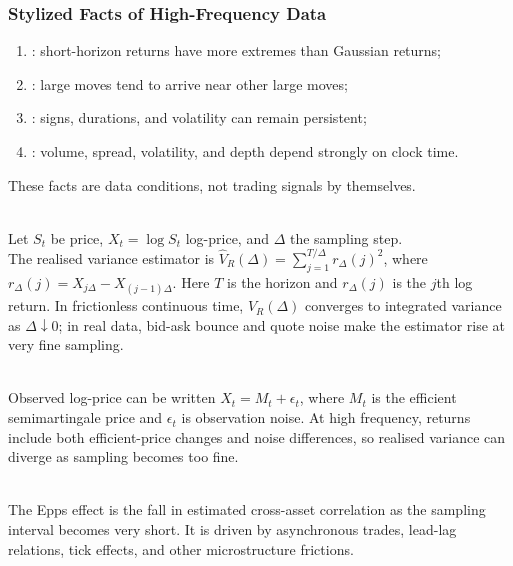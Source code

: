 \subsubsection{Stylized Facts of High-Frequency Data}

\begin{taxonomy} 
\begin{enumerate}[label=\roman*.]
\setlength{\itemsep}{0pt}
\item {}: short-horizon returns have more extremes than Gaussian returns;
\item {}: large moves tend to arrive near other large moves;
\item {}: signs, durations, and volatility can remain persistent;
\item {}: volume, spread, volatility, and depth depend strongly on clock time.
\end{enumerate}
These facts are data conditions, not trading signals by themselves.
\end{taxonomy}

\begin{model} \\
Let $S_t$ be price, $X_t=\log S_t$ log-price, and $\Delta$ the sampling step.\\
The realised variance estimator is $\hat{V}_R(\Delta)=\sum\limits_{j=1}^{T/\Delta}r_\Delta(j)^2$, where $r_\Delta(j)=X_{j\Delta}-X_{(j-1)\Delta}$. Here $T$ is the horizon and $r_\Delta(j)$ is the $j$th log return. In frictionless continuous time, $\hat{V}_R(\Delta)$ converges to integrated variance as $\Delta\downarrow0$; in real data, bid-ask bounce and quote noise make the estimator rise at very fine sampling.
\end{model}

\begin{mechanism} \\
Observed log-price can be written $X_t=M_t+\epsilon_t$, where $M_t$ is the efficient semimartingale price and $\epsilon_t$ is observation noise. At high frequency, returns include both efficient-price changes and noise differences, so realised variance can diverge as sampling becomes too fine.
\end{mechanism}

\begin{definition} \\
The Epps effect is the fall in estimated cross-asset correlation as the sampling interval becomes very short. It is driven by asynchronous trades, lead-lag relations, tick effects, and other microstructure frictions.
\end{definition}

